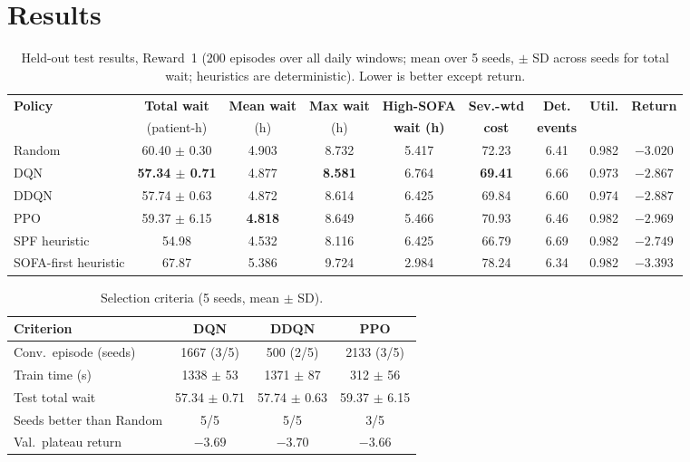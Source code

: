 \documentclass{rlreport}
\begin{document}
\section{Results}\label{sec:results}
\begin{table}[!t]
  \caption{Held-out test results, Reward~1 (200 episodes over all daily windows; mean over 5 seeds, $\pm$ SD across seeds for total wait; heuristics are deterministic). Lower is better except return.}
  \label{tab:results}
  \centering
  \footnotesize
  \setlength{\tabcolsep}{4pt}
  \begin{tabular}{lcccccccc}
    \toprule
    \textbf{Policy} & \textbf{Total wait} & \textbf{Mean wait} & \textbf{Max wait} & \textbf{High-SOFA} & \textbf{Sev.-wtd} & \textbf{Det.} & \textbf{Util.} & \textbf{Return} \\
     & (patient-h) & (h) & (h) & \textbf{wait (h)} & \textbf{cost} & \textbf{events} & & \\
    \midrule
    Random      & 60.40 $\pm$ 0.30 & 4.903 & 8.732 & 5.417 & 72.23 & 6.41 & 0.982 & $-3.020$ \\
    DQN         & \textbf{57.34 $\pm$ 0.71} & 4.877 & \textbf{8.581} & 6.764 & \textbf{69.41} & 6.66 & 0.973 & $\mathbf{-2.867}$ \\
    DDQN        & 57.74 $\pm$ 0.63 & 4.872 & 8.614 & 6.425 & 69.84 & 6.60 & 0.974 & $-2.887$ \\
    PPO         & 59.37 $\pm$ 6.15 & \textbf{4.818} & 8.649 & 5.466 & 70.93 & 6.46 & 0.982 & $-2.969$ \\
    \midrule
    SPF heuristic & 54.98 & 4.532 & 8.116 & 6.425 & 66.79 & 6.69 & 0.982 & $-2.749$ \\
    SOFA-first heuristic & 67.87 & 5.386 & 9.724 & 2.984 & 78.24 & 6.34 & 0.982 & $-3.393$ \\
    \bottomrule
  \end{tabular}
\end{table}

\begin{table}[!t]
  \caption{Selection criteria (5 seeds, mean $\pm$ SD).}
  \label{tab:select}
  \centering
  \footnotesize
  \setlength{\tabcolsep}{3pt}
  \begin{tabular}{lccc}
    \toprule
    \textbf{Criterion} & \textbf{DQN} & \textbf{DDQN} & \textbf{PPO} \\
    \midrule
    Conv.\ episode (seeds) & 1667 (3/5) & 500 (2/5) & 2133 (3/5) \\
    Train time (s) & 1338 $\pm$ 53 & 1371 $\pm$ 87 & 312 $\pm$ 56 \\
    Test total wait & 57.34 $\pm$ 0.71 & 57.74 $\pm$ 0.63 & 59.37 $\pm$ 6.15 \\
    Seeds better than Random & 5/5 & 5/5 & 3/5 \\
    Val.\ plateau return & $-3.69$ & $-3.70$ & $-3.66$ \\
    \bottomrule
  \end{tabular}
\end{table}
\end{document}
